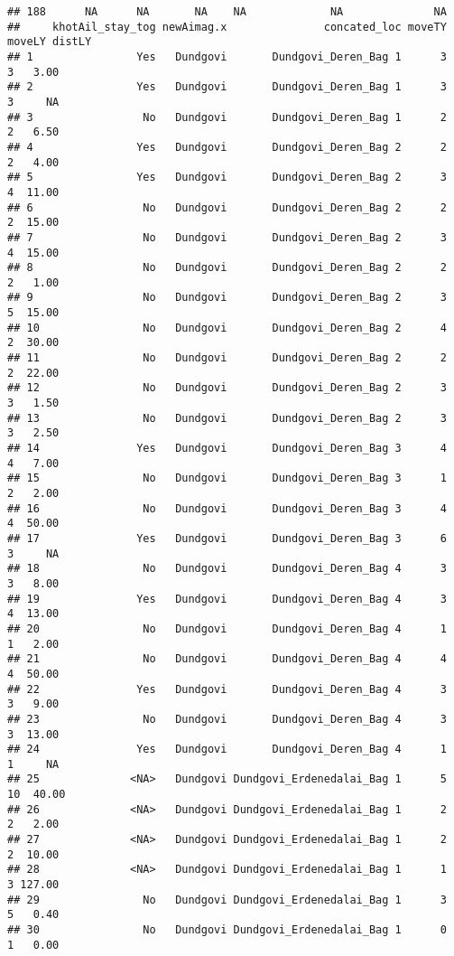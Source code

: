 \documentclass[
]{article}
\begin{document}
\begin{verbatim}
## 188      NA      NA       NA    NA             NA              NA
##     khotAil_stay_tog newAimag.x               concated_loc moveTY moveLY distLY
## 1                Yes   Dundgovi       Dundgovi_Deren_Bag 1      3      3   3.00
## 2                Yes   Dundgovi       Dundgovi_Deren_Bag 1      3      3     NA
## 3                 No   Dundgovi       Dundgovi_Deren_Bag 1      2      2   6.50
## 4                Yes   Dundgovi       Dundgovi_Deren_Bag 2      2      2   4.00
## 5                Yes   Dundgovi       Dundgovi_Deren_Bag 2      3      4  11.00
## 6                 No   Dundgovi       Dundgovi_Deren_Bag 2      2      2  15.00
## 7                 No   Dundgovi       Dundgovi_Deren_Bag 2      3      4  15.00
## 8                 No   Dundgovi       Dundgovi_Deren_Bag 2      2      2   1.00
## 9                 No   Dundgovi       Dundgovi_Deren_Bag 2      3      5  15.00
## 10                No   Dundgovi       Dundgovi_Deren_Bag 2      4      2  30.00
## 11                No   Dundgovi       Dundgovi_Deren_Bag 2      2      2  22.00
## 12                No   Dundgovi       Dundgovi_Deren_Bag 2      3      3   1.50
## 13                No   Dundgovi       Dundgovi_Deren_Bag 2      3      3   2.50
## 14               Yes   Dundgovi       Dundgovi_Deren_Bag 3      4      4   7.00
## 15                No   Dundgovi       Dundgovi_Deren_Bag 3      1      2   2.00
## 16                No   Dundgovi       Dundgovi_Deren_Bag 3      4      4  50.00
## 17               Yes   Dundgovi       Dundgovi_Deren_Bag 3      6      3     NA
## 18                No   Dundgovi       Dundgovi_Deren_Bag 4      3      3   8.00
## 19               Yes   Dundgovi       Dundgovi_Deren_Bag 4      3      4  13.00
## 20                No   Dundgovi       Dundgovi_Deren_Bag 4      1      1   2.00
## 21                No   Dundgovi       Dundgovi_Deren_Bag 4      4      4  50.00
## 22               Yes   Dundgovi       Dundgovi_Deren_Bag 4      3      3   9.00
## 23                No   Dundgovi       Dundgovi_Deren_Bag 4      3      3  13.00
## 24               Yes   Dundgovi       Dundgovi_Deren_Bag 4      1      1     NA
## 25              <NA>   Dundgovi Dundgovi_Erdenedalai_Bag 1      5     10  40.00
## 26              <NA>   Dundgovi Dundgovi_Erdenedalai_Bag 1      2      2   2.00
## 27              <NA>   Dundgovi Dundgovi_Erdenedalai_Bag 1      2      2  10.00
## 28              <NA>   Dundgovi Dundgovi_Erdenedalai_Bag 1      1      3 127.00
## 29                No   Dundgovi Dundgovi_Erdenedalai_Bag 1      3      5   0.40
## 30                No   Dundgovi Dundgovi_Erdenedalai_Bag 1      0      1   0.00

\end{verbatim}
\end{document}
